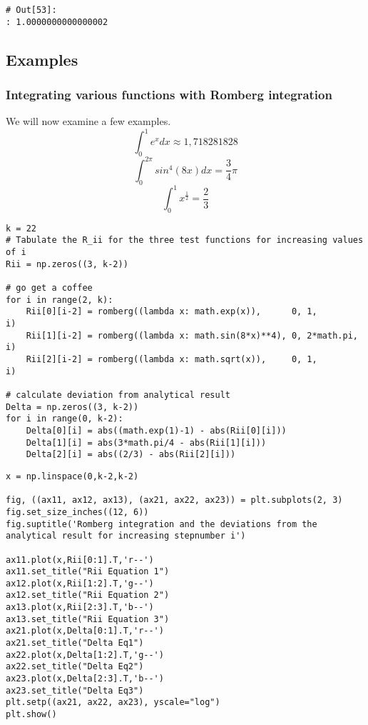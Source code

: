 \documentclass[11pt]{article}
\begin{document}
\begin{verbatim}
# Out[53]:
: 1.0000000000000002
\end{verbatim}

\subsection{Examples}
\label{sec:orgc483764}
\subsubsection{Integrating various functions with Romberg integration}
\label{sec:org65f944b}
We will now examine a few examples.
\begin{equation}
    \int_0^1 e^x dx \approx 1,718281828
\end{equation}
\begin{equation}
    \int_0^{2\pi} sin^4(8x) dx = \frac{3}{4}\pi
\end{equation}
\begin{equation}
    \int_0^{1} x^{\frac{1}{2}} = \frac{2}{3} 
\end{equation}

\begin{verbatim}
k = 22
# Tabulate the R_ii for the three test functions for increasing values of i
Rii = np.zeros((3, k-2))

# go get a coffee
for i in range(2, k):
    Rii[0][i-2] = romberg((lambda x: math.exp(x)),      0, 1,         i)
    Rii[1][i-2] = romberg((lambda x: math.sin(8*x)**4), 0, 2*math.pi, i)
    Rii[2][i-2] = romberg((lambda x: math.sqrt(x)),     0, 1,         i)

# calculate deviation from analytical result
Delta = np.zeros((3, k-2))
for i in range(0, k-2):
    Delta[0][i] = abs((math.exp(1)-1) - abs(Rii[0][i]))
    Delta[1][i] = abs(3*math.pi/4 - abs(Rii[1][i]))
    Delta[2][i] = abs((2/3) - abs(Rii[2][i]))
\end{verbatim}

\begin{verbatim}
x = np.linspace(0,k-2,k-2)

fig, ((ax11, ax12, ax13), (ax21, ax22, ax23)) = plt.subplots(2, 3)
fig.set_size_inches((12, 6))
fig.suptitle('Romberg integration and the deviations from the analytical result for increasing stepnumber i')

ax11.plot(x,Rii[0:1].T,'r--')
ax11.set_title("Rii Equation 1")
ax12.plot(x,Rii[1:2].T,'g--')
ax12.set_title("Rii Equation 2")
ax13.plot(x,Rii[2:3].T,'b--')
ax13.set_title("Rii Equation 3")
ax21.plot(x,Delta[0:1].T,'r--')
ax21.set_title("Delta Eq1")
ax22.plot(x,Delta[1:2].T,'g--')
ax22.set_title("Delta Eq2")
ax23.plot(x,Delta[2:3].T,'b--')
ax23.set_title("Delta Eq3")
plt.setp((ax21, ax22, ax23), yscale="log")
plt.show()
\end{verbatim}
\end{document}
